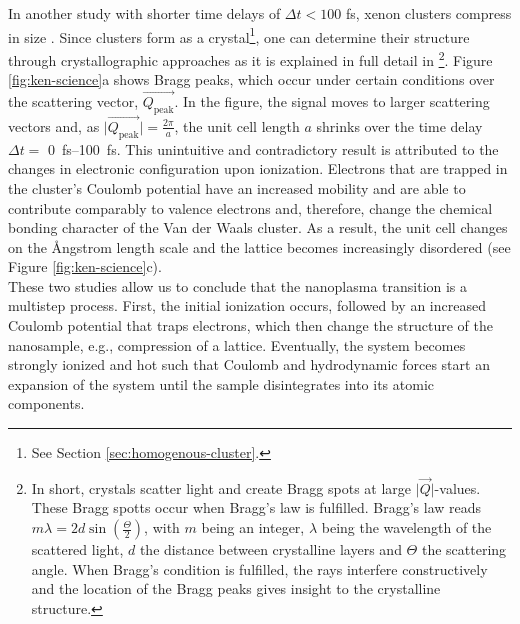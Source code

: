 In another study with shorter time delays of $\Delta t<100$ fs, xenon clusters compress in size \citep{Ferguson-2016-SciAdv}. Since clusters form as a crystal\footnote{See Section \ref{sec:homogenous-cluster}.}, one can determine their structure through crystallographic approaches as it is explained in full detail in \citep[][chapter 5]{Als-Nielson-2011-JWS}\footnote{In short, crystals scatter light and create Bragg spots at large $\lvert \vec{Q}\rvert$-values. These Bragg spotts occur when Bragg's law is fulfilled. Bragg's law reads $m \lambda = 2d \sin\left(\frac{\Theta}{2}\right)$, with $m$ being an integer, $\lambda$ being the wavelength of the scattered light, $d$ the distance between crystalline layers and $\Theta$ the scattering angle. When Bragg's condition is fulfilled, the rays interfere constructively and the location of the Bragg peaks gives insight to the crystalline structure.}. Figure \ref{fig:ken-science}a shows Bragg peaks, which occur under certain conditions over the scattering vector, $\vec{Q_{\text{peak}}}$. In the figure, the signal moves to larger scattering vectors and, as $\lvert \vec{Q_{\text{peak}}}\rvert=\tfrac{2\pi}{a}$, the unit cell length $a$ shrinks over the time delay $\Delta t =$ \SIrange{0}{100}{\femto\second}. This unintuitive and contradictory result is attributed to the changes in electronic configuration upon ionization. Electrons that are trapped in the cluster's Coulomb potential have an increased mobility and are able to contribute comparably to valence electrons and, therefore, change the chemical bonding character of the Van der Waals cluster. As a result, the unit cell changes on the {\AA}ngstrom length scale and the lattice becomes increasingly disordered (see Figure \ref{fig:ken-science}c).\\[1\baselineskip]
These two studies allow us to conclude that the nanoplasma transition is a multistep process. First, the initial ionization occurs, followed by an increased Coulomb potential that traps electrons, which then change the structure of the nanosample, e.g., compression of a lattice. Eventually, the system becomes strongly ionized and hot such that Coulomb and hydrodynamic forces start an expansion of the system until the sample disintegrates into its atomic components.
%
%
%
